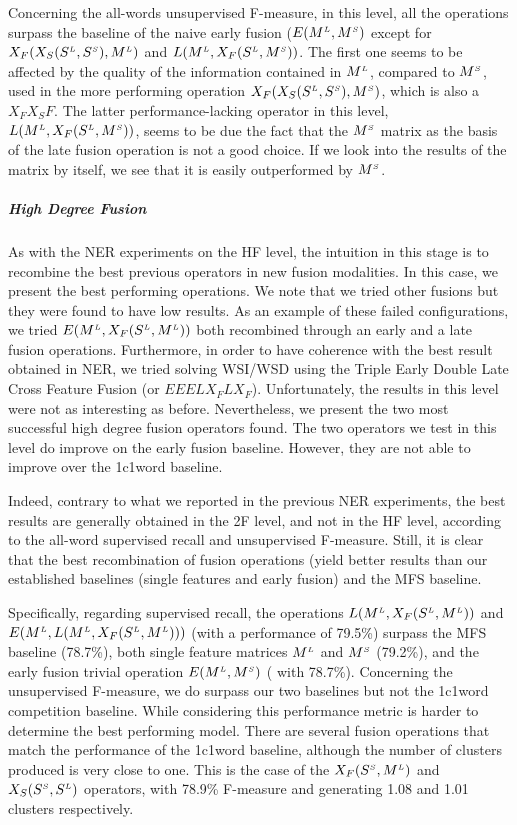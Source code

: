 Concerning the all-words unsupervised F-measure, in this level, all the operations surpass the baseline of the naive early fusion ($E(M^{\scriptscriptstyle L},M^{\scriptscriptstyle S})$ except for  $X_F(X_S(S^{\scriptscriptstyle L},S^{\scriptscriptstyle S}),M^{\scriptscriptstyle L})$ and $L(M^{\scriptscriptstyle L}, X_F(S^{\scriptscriptstyle L},M^{\scriptscriptstyle S}))$. The first one seems to be affected by the quality of the information contained in $M^{\scriptscriptstyle L}$, compared to $M^{\scriptscriptstyle S}$, used in the more performing operation $X_F(X_S(S^{\scriptscriptstyle L}, S^{\scriptscriptstyle S}), M^{\scriptscriptstyle S})$, which is also a $X_FX_SF$.  The latter performance-lacking operator in this level, $L(M^{\scriptscriptstyle L}, X_F(S^{\scriptscriptstyle L},M^{\scriptscriptstyle S}))$, seems to be due the fact that the $M^{\scriptscriptstyle S}$ matrix as the basis of the late fusion operation is not a good choice. If we look into the results of the matrix by itself, we see that it is easily outperformed by $M^{\scriptscriptstyle S}$.




\subparagraph{High Degree Fusion}
As with the NER experiments on the HF level, the intuition in this stage is to recombine the best previous  operators in new fusion modalities. In this case, we present the best performing operations. We note that we tried other fusions but they were found to have low results. As an example of these failed configurations, we tried $E(M^{\scriptscriptstyle L},X_F(S^{\scriptscriptstyle L},M^{\scriptscriptstyle L}))$ both recombined through an early and a late fusion operations. Furthermore, in order to have coherence with the best result obtained in NER, we tried solving WSI/WSD using the Triple Early Double Late Cross Feature Fusion (or $EEELX_FLX_F$). Unfortunately, the results in this level were not as interesting as before. Nevertheless, we present the two most successful high degree fusion operators found. The two operators we test in this level do improve on the early fusion baseline. However, they are not able to improve over the 1c1word baseline. 

Indeed, contrary to what we reported in the previous NER experiments, the best results are generally obtained in the 2F level, and not in the HF level, according to the all-word supervised recall and unsupervised F-measure. Still, it is clear that the best recombination of fusion operations (yield better results than our established baselines (single features and early fusion) and the MFS baseline.

Specifically, regarding supervised recall, the operations $L(M^{\scriptscriptstyle L}, X_F(S^{\scriptscriptstyle L},M^{\scriptscriptstyle L}))$ and $E(M^{\scriptscriptstyle L},L(M^{\scriptscriptstyle L},X_F(S^{\scriptscriptstyle L},M^{\scriptscriptstyle L})))$ (with a performance of 79.5\%) surpass the MFS baseline (78.7\%), both single feature matrices $M^{\scriptscriptstyle L}$ and $M^{\scriptscriptstyle S}$ (79.2\%), and the early fusion trivial operation $E(M^{\scriptscriptstyle L},M^{\scriptscriptstyle S})$ ( with 78.7\%). Concerning the unsupervised F-measure, we do surpass our two baselines but not the 1c1word competition baseline. While considering this performance metric is harder to determine the best performing model. There are several fusion operations that match the performance of the 1c1word baseline, although the number of clusters produced is very close to one. This is the case of the $X_F(S^{\scriptscriptstyle S},M^{\scriptscriptstyle L})$ and $X_S(S^{\scriptscriptstyle S},S^{\scriptscriptstyle L})$ operators, with 78.9\% F-measure and generating 1.08 and 1.01 clusters respectively. 

